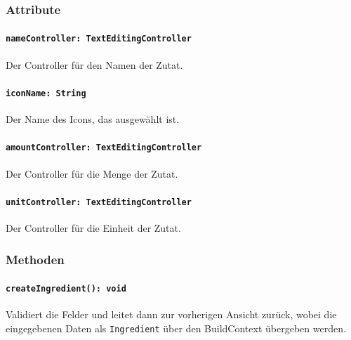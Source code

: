 \documentclass{entwurfsheft}
\begin{document}
\begin{sloppypar}
\subsubsection*{Attribute}
\paragraph{\texttt{nameController: TextEditingController}}
Der Controller für den Namen der Zutat.
\paragraph{\texttt{iconName: String}}
Der Name des Icons, das ausgewählt ist.
\paragraph{\texttt{amountController: TextEditingController}}
Der Controller für die Menge der Zutat.
\paragraph{\texttt{unitController: TextEditingController}}
Der Controller für die Einheit der Zutat.
\subsubsection*{Methoden}
\paragraph{\texttt{createIngredient(): void}}
Validiert die Felder und leitet dann zur vorherigen Ansicht zurück, wobei die eingegebenen Daten als \texttt{Ingredient} über den \Gls{BuildContext} übergeben werden.
\newpage

\end{sloppypar}
\end{document}
